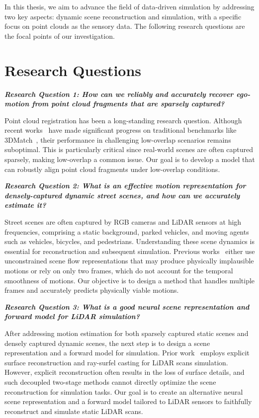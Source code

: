 In this thesis, we aim to advance the field of data-driven simulation by addressing two key aspects: dynamic scene reconstruction and simulation, with a specific focus on point clouds as the sensory data. The following research questions are the focal points of our investigation.

\section{Research Questions}

\noindent
\textbf{\textit{Research Question 1: How can we reliably and accurately recover ego-motion from point cloud fragments that are sparsely captured?}}

Point cloud registration has been a long-standing research question. Although recent works~\cite{gojcic2018learned,Choy2019FCGF} have made significant progress on traditional benchmarks like 3DMatch~\cite{zeng20163dmatch}, their performance in challenging low-overlap scenarios remains suboptimal. This is particularly critical since real-world scenes are often captured sparsely, making low-overlap a common issue. Our goal is to develop a model that can robustly align point cloud fragments under low-overlap conditions.

\noindent
\textbf{\textit{Research Question 2: What is an effective motion representation for densely-captured dynamic street scenes, and how can we accurately estimate it?}}

Street scenes are often captured by RGB cameras and LiDAR sensors at high frequencies, comprising a static background, parked vehicles, and moving agents such as vehicles, bicycles, and pedestrians. Understanding these scene dynamics is essential for reconstruction and subsequent simulation. Previous works~\cite{li2020neural,gojcic2021weakly} either use unconstrained scene flow representations that may produce physically implausible motions or rely on only two frames, which do not account for the temporal smoothness of motions. Our objective is to design a method that handles multiple frames and accurately predicts physically viable motions.

\noindent
\textbf{\textit{Research Question 3: What is a good neural scene representation and forward model for LiDAR simulation?}}

After addressing motion estimation for both sparsely captured static scenes and densely captured dynamic scenes, the next step is to design a scene representation and a forward model for simulation. Prior work~\cite{manivasagam2020lidarsim} employs explicit surface reconstruction and ray-surfel casting for LiDAR scans simulation. However, explicit reconstruction often results in the loss of surface details, and such decoupled two-stage methods cannot directly optimize the scene reconstruction for simulation tasks. Our goal is to create an alternative neural scene representation and a forward model tailored to LiDAR sensors to faithfully reconstruct and simulate static LiDAR scans.

